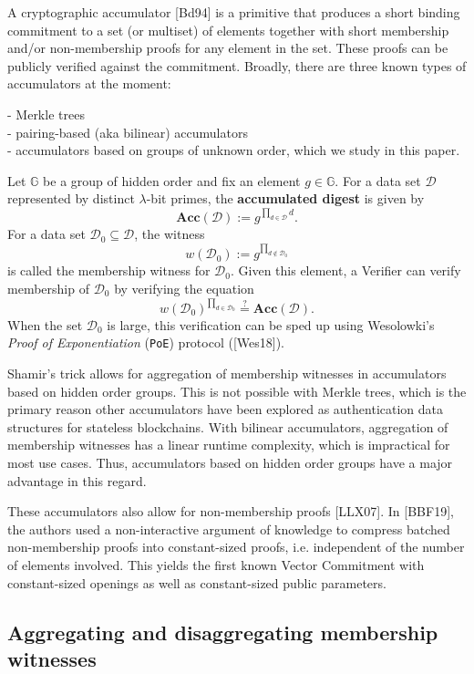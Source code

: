 \documentclass[11pt, lettersize, notitlepage, leqno, footskip=0.6cm]{article}
\newcommand{\pl}{\prod\limits}
\newcommand{\Acc}{\mbf{Acc}}
\newcommand{\mc}{\mathcal}
\newcommand{\mb}{\mathbb}
\newcommand{\mbf}{\mathbf}
\newcommand{\lam}{\lambda}
\newcommand{\sub}{\subseteq}
\newcommand{\vs}{\vspace{-0.15cm}}
\newcommand{\noin}{\noindent}
\newcommand{\sta}{\stackrel{?}{=}}
\numberwithin{equation}{section}
\begin{document}
A cryptographic accumulator [Bd94] is a primitive that produces a short binding commitment to a set (or multiset) of elements together with short membership and/or non-membership proofs for any element in the set. These proofs can be publicly verified against the commitment. Broadly, there are three known types of accumulators at the moment: 

\noin - Merkle trees\\
- pairing-based (aka bilinear) accumulators \\  
- accumulators based on groups of unknown order, which we study in this paper. 

Let $\mb{G}$ be a group of hidden order and fix an element $g \in\mb{G}$. For a data set $\mc{D}$ represented by distinct $\lam$-bit primes, the \textbf{accumulated digest} is given by \vs $$\Acc(\mc{D}):= g^{\prod\limits_{d\in\mc{D}} d} .$$ For a data set $\mc{D_0}\sub \mc{D}$, the witness \vs $$w(\mc{D}_0) := g^{\pl_{d\notin \mc{D}_0}} $$ is called the membership witness for $\mc{D}_0$. Given this element, a Verifier can verify membership of $\mc{D}_0$ by verifying the equation \vs $$w(\mc{D}_0)^{\pl_{d\in\mc{D}_0}} \sta \Acc(\mc{D}).$$ When the set $\mc{D}_0$ is large, this verification can be sped up using Wesolowki's \textit{Proof of Exponentiation} (\verb|PoE|) protocol ([Wes18]).

Shamir's trick allows for aggregation of membership witnesses in accumulators based on hidden order groups. This is not possible with Merkle trees, which is the primary reason other accumulators have been explored as authentication data structures for stateless blockchains. With bilinear accumulators, aggregation of membership witnesses has a linear runtime complexity, which is impractical for most use cases. Thus, accumulators based on hidden order groups have a major advantage in this regard.

These accumulators also allow for non-membership proofs [LLX07]. In [BBF19], the authors used a non-interactive argument of knowledge to compress batched non-membership proofs into constant-sized proofs, i.e. independent of the number of elements involved. This yields the first known Vector Commitment with constant-sized openings as well as  constant-sized public parameters.


\subsection{\fontsize{11}{11} Aggregating and disaggregating membership witnesses}
\end{document}

